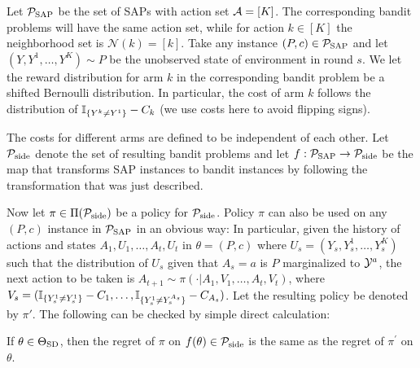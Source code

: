 Let $\mathcal{P}_{\mathrm{SAP}}$ be the set of SAPs with action set $\mathcal{A} = [K]$.
The corresponding bandit problems will have the same action set,
while for action $k\in [K]$ the neighborhood set is $\mathcal{N}(k) = [k]$.
Take any instance $(P,c)\in \mathcal{P}_{\mathrm{SAP}}$ and let $(Y,Y^1,\dots,Y^K) \sim P$ be the 
unobserved state of environment in round $s$.
We let the reward distribution for arm $k$ in the corresponding bandit problem
be a shifted Bernoulli distribution.
In particular, the cost of arm $k$ follows the distribution of 
$\mathbb{I}_{\{Y^k\ne Y^1\}} - C_k$ (we use costs here to avoid flipping signs).

The costs for different arms are defined to be independent of each other.
Let $\mathcal{P}_{\mathrm{side}}$ denote the set of resulting bandit problems and let $f:\mathcal{P}_{\mathrm{SAP}} \to \mathcal{P}_{\mathrm{side}}$
be the map that transforms SAP instances to bandit instances by following the
transformation that was just described.

Now let $\pi\in \Pi(\mathcal{P}_{\mathrm{side}})$ be a policy for $\mathcal{P}_{\mathrm{side}}$.
Policy $\pi$ can also be used on any $(P,c)$ instance in $\mathcal{P}_{\mathrm{SAP}}$ in an obvious way:
In particular, given the history of actions and states $A_1,U_1,\dots,A_t,U_t$
in $\theta=(P,c)$ where $U_s = (Y_s,Y_s^1,\dots,Y_s^{K})$ such that 
the distribution of $U_s$ given that $A_s=a$ is $P$ marginalized to $\mathcal{Y}^{a}$,
the next action to be taken is 
$A_{t+1}\sim \pi(\cdot| A_1, V_1,\dots,A_t,V_t)$, where 
$V_s = (\mathbb{I}_{\{Y_s^1\ne Y_s^1\}}-C_1,\dots,\mathbb{I}_{\{Y_s^1\ne Y_s^{A_s}\}}-C_{A_s})$. Let the resulting policy be denoted by $\pi'$.
The following can be checked by simple direct calculation:
\begin{prop} 
	\label{prop:equivalence}
If $\theta \in \Theta_{\mathrm{SD}}$, then the regret of $\pi$ on $f(\theta)\in \mathcal{P}_{\mathrm{side}}$
is the same as the regret of $\pi^\prime$ on $\theta$. 
\end{prop}

